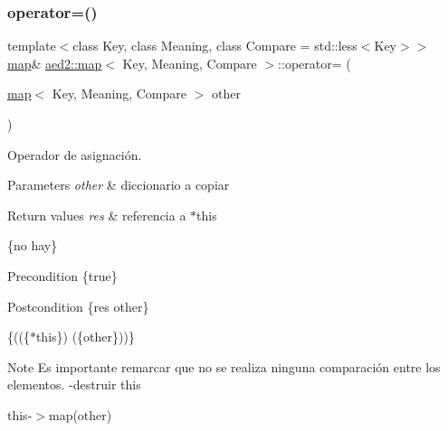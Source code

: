 \subsubsection{\texorpdfstring{operator=()}{operator=()}\hspace{0.1cm}{\footnotesize\ttfamily [2/2]}}
{\footnotesize\ttfamily template$<$class Key, class Meaning, class Compare = std\+::less$<$\+Key$>$$>$ \\
\hyperlink{classaed2_1_1map}{map}\& \hyperlink{classaed2_1_1map}{aed2\+::map}$<$ Key, Meaning, Compare $>$\+::operator= (\begin{DoxyParamCaption}\item[{\hyperlink{classaed2_1_1map}{map}$<$ Key, Meaning, Compare $>$}]{other }\end{DoxyParamCaption})\hspace{0.3cm}{\ttfamily [inline]}}



Operador de asignación. 


\begin{DoxyParams}{Parameters}
{\em other} & diccionario a copiar \\
\hline
\end{DoxyParams}

\begin{DoxyRetVals}{Return values}
{\em res} & referencia a $\ast$this\\
\hline
\end{DoxyRetVals}
\{no hay\}

\begin{DoxyPrecond}{Precondition}
\{true\} 
\end{DoxyPrecond}
\begin{DoxyPostcond}{Postcondition}
\{res  other\}
\end{DoxyPostcond}
\{((\{$\ast$this\})  (\{other\}))\}

\begin{DoxyNote}{Note}
Es importante remarcar que no se realiza ninguna comparación entre los elementos. -\/destruir this
\begin{DoxyItemize}
\item this-\/$>$map(other) 
\end{DoxyItemize}
\end{DoxyNote}
\mbox{\label{classaed2_1_1map_a96f23896164ab47bee48c26b803f9801}} 
